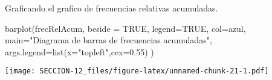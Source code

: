 \documentclass[
]{article}
\newenvironment{Shaded}{\begin{snugshade}}{\end{snugshade}}
\newcommand{\AttributeTok}[1]{\textcolor[rgb]{0.77,0.63,0.00}{#1}}
\newcommand{\ConstantTok}[1]{\textcolor[rgb]{0.00,0.00,0.00}{#1}}
\newcommand{\FloatTok}[1]{\textcolor[rgb]{0.00,0.00,0.81}{#1}}
\newcommand{\FunctionTok}[1]{\textcolor[rgb]{0.00,0.00,0.00}{#1}}
\newcommand{\NormalTok}[1]{#1}
\newcommand{\StringTok}[1]{\textcolor[rgb]{0.31,0.60,0.02}{#1}}
\begin{document}
Graficando el grafico de frecuencias relativas acumuladas.

\begin{Shaded}
\begin{Highlighting}[]
\FunctionTok{barplot}\NormalTok{(frecRelAcum,}
        \AttributeTok{beside =} \ConstantTok{TRUE}\NormalTok{,}
        \AttributeTok{legend=}\ConstantTok{TRUE}\NormalTok{,}
        \AttributeTok{col=}\NormalTok{azul,}
        \AttributeTok{main=}\StringTok{"Diagrama de barras de frecuencias acumuladas"}\NormalTok{,}
        \AttributeTok{args.legend=}\FunctionTok{list}\NormalTok{(}\AttributeTok{x=}\StringTok{"topleft"}\NormalTok{,}\AttributeTok{cex=}\FloatTok{0.55}\NormalTok{)}
\NormalTok{        )}
\end{Highlighting}
\end{Shaded}

\texttt{[image: SECCION-12\_files/figure-latex/unnamed-chunk-21-1.pdf]}
\end{document}
